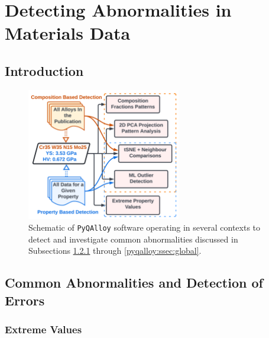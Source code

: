 \chapter{Detecting Abnormalities in Materials Data}  \label{chap:pyqalloy}


\section{Introduction} \label{pyqalloy:sec:intro}

\todo

\begin{figure}[H]
    \centering
    \includegraphics[width=0.6\textwidth]{pyqalloy/AbnormalCompositionDetection_v1.png}
    \caption{Schematic of \texttt{PyQAlloy} software operating in several contexts to detect and investigate common abnormalities discussed in Subsections \ref{pyqalloy:ssec:extreme} through \ref{pyqalloy:ssec:global}.}
    \label{pyqalloy:fig:schematic}
\end{figure}

\section{Common Abnormalities and Detection of Errors} \label{pyqalloy:sec:abnormalities}


\subsection{Extreme Values} \label{pyqalloy:ssec:extreme}

\todo

